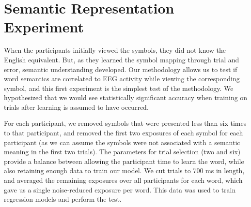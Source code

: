 \section{Semantic Representation Experiment}
\label{sec:experiments:semanticrepresentation}
When the participants initially viewed the symbols, they did not know the English equivalent. But, as they learned the symbol mapping through trial and error, semantic understanding developed. Our methodology allows us to test if word semantics are correlated to EEG activity while viewing the corresponding symbol, and this first experiment is the simplest test of the methodology. We hypothesized that we would see statistically significant accuracy when training on trials after learning is assumed to have occurred.

For each participant, we removed symbols that were presented less than six times to that participant, and removed the first two exposures of each symbol for each participant (as we can assume the symbols were not associated with a semantic meaning in the first two trials). The parameters for trial selection (two and six) provide a balance between allowing the participant time to learn the word, while also retaining enough data to train our model. We cut trials to 700 ms in length, and averaged the remaining exposures over all participants for each word, which gave us a single noise-reduced exposure per word. This data was used to train regression models and perform the \tvt test. 
